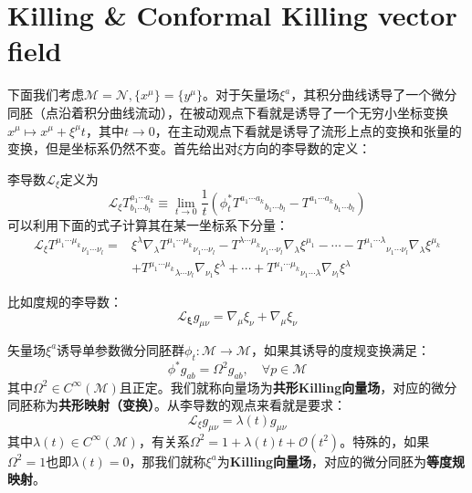 \section{Killing \& Conformal Killing vector field}
下面我们考虑$\mathcal{M}=\mathcal{N},\{x^\mu\}=\{y^\mu\}$。对于矢量场$\xi^a$，其积分曲线诱导了一个微分同胚（点沿着积分曲线流动），在被动观点下看就是诱导了一个无穷小坐标变换$x^\mu\mapsto x^\mu+\xi^\mu t$，其中$t\to0$，在主动观点下看就是诱导了流形上点的变换和张量的变换，但是坐标系仍然不变。首先给出对$\xi$方向的李导数的定义：
\begin{definition}[李导数]
	李导数$\mathscr{L}_\xi$定义为
	\[\mathscr{L}_{\xi}T^{{a_1\cdots a_k}}_{b_1\cdots b_l}\equiv\lim_{t\to0}\frac{1}{t}\left(\phi_t^*{T^{a_1\cdots a_k}}_{b_1\cdots b_l}-{T^{a_1\cdots a_k}}_{b_1\cdots b_l}\right)\]
	可以利用下面的式子计算其在某一坐标系下分量：
	\begin{equation}
		\begin{aligned}
			\mathscr{L}_{\xi}{T^{\mu_1\cdots \mu_k}}_{\nu_1\cdots\nu_l}=&\xi^\lambda\nabla_\lambda{T^{\mu_1\cdots \mu_k}}_{\nu_1\cdots\nu_l}-{T^{\lambda\cdots \mu_k}}_{\nu_1\cdots\nu_l}\nabla_\lambda\xi^{\mu_1}-\cdots-{T^{\mu_1\cdots \lambda}}_{\nu_1\cdots\nu_l}\nabla_\lambda\xi^{\mu_k}\\
			&+{T^{\mu_1\cdots \mu_k}}_{\lambda\cdots\nu_l}\nabla_{\nu_1}\xi^{\lambda}+\cdots+{T^{\mu_1\cdots \mu_k}}_{\nu_1\cdots\lambda}\nabla_{\nu_l}\xi^{\lambda}
		\end{aligned}		
	\end{equation}
\end{definition}
比如度规的李导数：
\begin{equation}
	\mathscr{L}_\mathbf{\xi} g_{\mu\nu}=\nabla_\mu\xi_\nu+\nabla_\mu\xi_\nu	
\end{equation}
\begin{definition}[Killing]
	矢量场$\xi^a$诱导单参数微分同胚群$\phi_t:\mathcal{M}\to\mathcal{M}$，如果其诱导的度规变换满足：
	\begin{equation}
		\phi^*g_{ab}=\Omega^2g_{ab},\quad \forall p\in\mathcal{M}
	\end{equation}
	其中$\Omega^2\in C^\infty(\mathcal{M})$且正定。我们就称向量场为\textbf{共形Killing向量场}，对应的微分同胚称为\textbf{共形映射（变换）}。从李导数的观点来看就是要求：
	\begin{equation}
		\mathscr{L}_\xi g_{\mu\nu}=\lambda(t)g_{\mu\nu}
	\end{equation}
	其中$\lambda(t)\in C^\infty(\mathcal{M})$，有关系$\Omega^2=1+\lambda(t)t+\mathcal{O}(t^2)$。特殊的，如果$\Omega^2=1$也即$\lambda(t)=0$，那我们就称$\xi^a$为\textbf{Killing向量场}，对应的微分同胚为\textbf{等度规映射}。
\end{definition}
